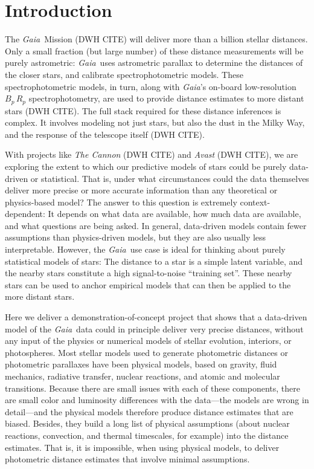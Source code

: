 \documentclass[12pt, preprint]{aastex6}
\newcommand{\project}[1]{\textsl{#1}}
\newcommand{\gaia}{\project{Gaia}}
\begin{document}

\section{Introduction}

The \gaia\ Mission (DWH CITE) will deliver more than a billion stellar distances.
Only a small fraction (but large number) of these distance
measurements will be purely astrometric:
\gaia\ uses astrometric parallax to determine the distances of the closer
stars, and calibrate spectrophotometric models.
These spectrophotometric models, in turn, along with \gaia's on-board
low-resolution $B_p\,R_p$ spectrophotometry, are used to provide
distance estimates to more distant stars (DWH CITE).
The full stack required for these distance inferences is complex.
It involves modeling not just stars, but also the dust in the Milky Way,
and the response of the telescope itself (DWH CITE).

With projects like \project{The Cannon} (DWH CITE) and \project{Avast}
(DWH CITE), we are exploring the extent to which our predictive models of
stars could be purely data-driven or statistical.
That is, under what circumstances could the data themselves deliver
more precise or more accurate information than any theoretical or
physics-based model?
The answer to this question is extremely context-dependent: It depends
on what data are available, how much data are available, and what
questions are being asked.
In general, data-driven models contain fewer assumptions than
physics-driven models, but they are also usually less interpretable.
However, the \gaia\ use case is ideal for thinking about purely statistical
models of stars:
The distance to a star is a simple latent variable, and the nearby
stars constitute a high signal-to-noise ``training set''.
These nearby stars can be used to anchor empirical models that can
then be applied to the more distant stars.

Here we deliver a demonstration-of-concept project that shows that a
data-driven model of the \gaia\ data could in principle deliver very
precise distances, without any input of the physics or numerical models of stellar
evolution, interiors, or photospheres.
Most stellar models used to generate photometric distances or photometric
parallaxes have been physical models, based on gravity, fluid mechanics,
radiative transfer, nuclear reactions, and atomic and molecular transitions.
Because there are small issues with each of these components, there are small
color and luminosity differences with the data---the models are wrong in detail---and
the physical models therefore produce distance estimates that are biased.
Besides, they build a long list of physical assumptions (about
nuclear reactions, convection, and thermal timescales, for example)
into the distance estimates.
That is, it is impossible, when using physical models,
to deliver photometric distance estimates that involve minimal assumptions.
\end{document}
